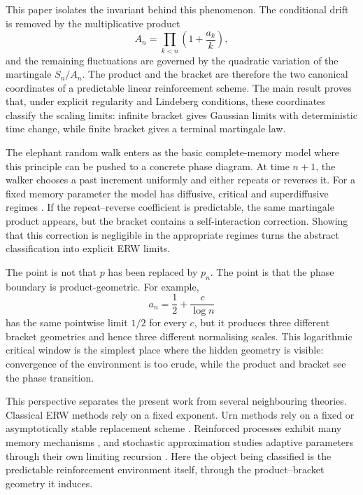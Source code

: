 \documentclass[11pt]{article}
\theoremstyle{definition}
\theoremstyle{remark}
\newcommand{\1}{\mathbf{1}}
\begin{document}
This paper isolates the invariant behind this phenomenon. The conditional drift
is removed by the multiplicative product
\[
  A_n=\prod_{k<n}\left(1+\frac{a_k}{k}\right),
\]
and the remaining fluctuations are governed by the quadratic variation of the
martingale \(S_n/A_n\). The product and the bracket are therefore the two
canonical coordinates of a predictable linear reinforcement scheme. The main
result proves that, under explicit regularity and Lindeberg conditions, these
coordinates classify the scaling limits: infinite bracket gives Gaussian limits
with deterministic time change, while finite bracket gives a terminal martingale
law.

The elephant random walk enters as the basic complete-memory model where this
principle can be pushed to a concrete phase diagram. At time \(n+1\), the walker
chooses a past increment uniformly and either repeats or reverses it. For a fixed
memory parameter the model has diffusive, critical and superdiffusive regimes
\citep{schutz2004elephants,colette2017central,baur2016elephant,bercu2018martingale}.
If the repeat--reverse coefficient is predictable, the same martingale product
appears, but the bracket contains a self-interaction correction. Showing that
this correction is negligible in the appropriate regimes turns the abstract
classification into explicit ERW limits.

The point is not that \(p\) has been replaced by \(p_n\). The point is that the
phase boundary is product-geometric. For example,
\[
  a_n=\frac12+\frac{c}{\log n}
\]
has the same pointwise limit \(1/2\) for every \(c\), but it produces three
different bracket geometries and hence three different normalising scales. This
logarithmic critical window is the simplest place where the hidden geometry is
visible: convergence of the environment is too crude, while the product and
bracket see the phase transition.

This perspective separates the present work from several neighbouring theories.
Classical ERW methods rely on a fixed exponent. Urn methods rely on a fixed or
asymptotically stable replacement scheme
\citep{janson2004urns,janson2005triangular,laruelle2013urns}. Reinforced
processes exhibit many memory mechanisms \citep{pemantle2007survey,laulin2022reinforced},
and stochastic approximation studies adaptive parameters through their own
limiting recursion \citep{kushner2003stochastic}. Here the object being
classified is the predictable reinforcement environment itself, through the
product--bracket geometry it induces.
\end{document}
